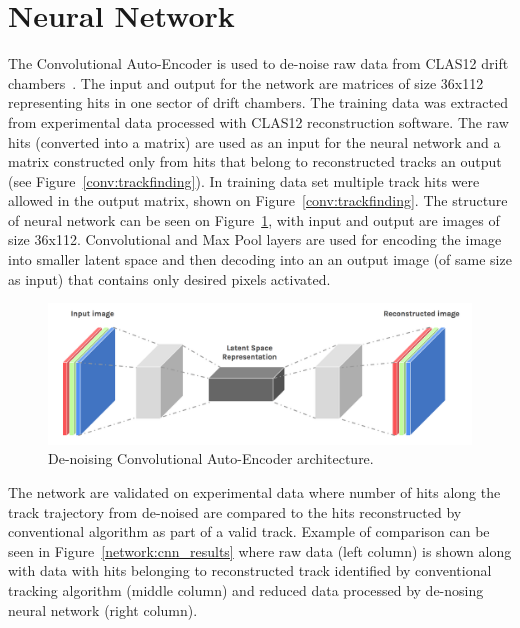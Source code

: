 \section{Neural Network}

The Convolutional Auto-Encoder is used to de-noise raw data from CLAS12 drift chambers~\cite{Thomadakis:2022zcd}. 
The input and output for the network are matrices of size 36x112 representing hits in one sector of drift chambers. 
The training data was extracted from experimental data processed with CLAS12 reconstruction software. 
The raw hits (converted into a matrix) are used as an input for the neural network and a matrix constructed 
only from hits that belong to reconstructed tracks an output (see Figure~\ref{conv:trackfinding}). 
In training data set multiple track hits were allowed in the output matrix, shown on Figure~\ref{conv:trackfinding}.
The structure of neural network can be seen on Figure~\ref{network:cnn_encoder}, with input and output are images
of size 36x112. Convolutional and Max Pool layers are used for encoding the image into smaller latent space and then
decoding into an an output image (of same size as input) that contains only desired pixels activated.

\begin{figure}[!h]
\begin{center}
 \includegraphics[width=5.1in]{images/convolutional-autoencoder.png}
\caption {De-noising Convolutional Auto-Encoder architecture. }
 \label{network:cnn_encoder}
 \end{center}
\end{figure}

The network are validated on experimental data where number of hits along the 
track trajectory from de-noised are compared to the hits reconstructed by conventional algorithm
as part of a valid track. Example of comparison can be seen in Figure~\ref{network:cnn_results} 
where raw data (left column) is shown along with data with hits belonging to reconstructed track 
identified by conventional tracking algorithm (middle column) and 
reduced data processed by de-nosing neural network (right column).

